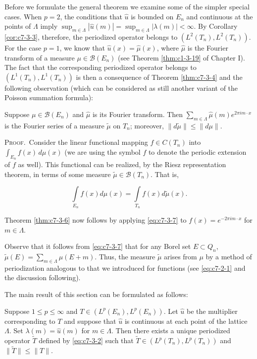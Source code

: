 Before we formulate the general theorem we examine some of the simpler special cases. When $p = 2$, the conditions that $\hat{u}$ is bounded on $E_n$ and continuous at the points of $\Lambda$ imply $\sup_{m \in \Lambda} |\hat{u}(m)| = \sup_{m \in \Lambda} |\lambda(m)| < \infty$. By Corollary \ref{cor:c7-3-3}, therefore, the periodized operator belongs to $(L^2(T_n), L^2(T_n))$. For the case $p = 1$, we know that $\hat{u}(x) = \hat{\mu}(x)$, where $\hat{\mu}$ is the Fourier transform of a measure $\mu \in \mathcal{B}(E_n)$ (see Theorem \ref{thm:c1-3-19} of Chapter I). The fact that the corresponding periodized operator belongs to $(L^1(T_n), L^1(T_n))$ is then a consequence of Theorem \eqref{thm:c7-3-4} and the following observation (which can be considered as still another variant of the Poisson summation formula):

\begin{theorem}
\label{thm:c7-3-6}
Suppose $\mu \in \mathcal{B}(E_n)$ and $\hat{\mu}$ is its Fourier transform. Then $\sum_{m \in \Lambda} \hat{\mu}(m) e^{2\pi i m \cdot x}$ is the Fourier series of a measure $\tilde{\mu}$ on $T_n$; moreover, $\|d\tilde{\mu}\| \leq \|d\mu\|$.
\end{theorem}

\textsc{Proof.}\ Consider the linear functional mapping $f \in C(T_n)$ into $\int_{E_n} f(x) \, d\mu(x)$ (we are using the symbol $f$ to denote the periodic extension of $f$ as well). This functional can be realized, by the Riesz representation theorem, in terms of some measure $\tilde{\mu} \in \mathcal{B}(T_n)$. That is,

\begin{equation}\label{eq:c7-3-7}
\int\limits_{E_{n}}f(x)d\mu(x)=\int\limits_{T_{n}}f(x)d\widetilde{\mu}(x).
\end{equation}

Theorem \ref{thm:c7-3-6} now follows by applying \eqref{eq:c7-3-7} to $f(x) = e^{-2\pi im\cdot x}$ for $m \in \Lambda$.

Observe that it follows from \eqref{eq:c7-3-7} that for any Borel set $E \subset Q_n$, $\tilde{\mu}(E) = \sum_{m \in \Lambda} \mu(E + m)$. Thus, the measure $\tilde{\mu}$ arises from $\mu$ by a method of periodization analogous to that we introduced for functions (see \eqref{eq:c7-2-1} and the discussion following).

The main result of this section can be formulated as follows:

\begin{theorem}
\label{thm:c7-3-8}
Suppose $1 \leq p \leq \infty$ and $T \in (L^p(E_n), L^p(E_n))$. Let $\hat{u}$ be the multiplier corresponding to $T$ and suppose that $\hat{u}$ is continuous at each point of the lattice $\Lambda$. Set $\lambda(m) = \hat{u}(m)$ for $m \in \Lambda$. Then there exists a unique periodized operator $\tilde{T}$ defined by \eqref{eq:c7-3-2} such that $\tilde{T} \in (L^p(T_n), L^p(T_n))$ and $\|\tilde{T}\| \leq \|T\|$.
\end{theorem}

